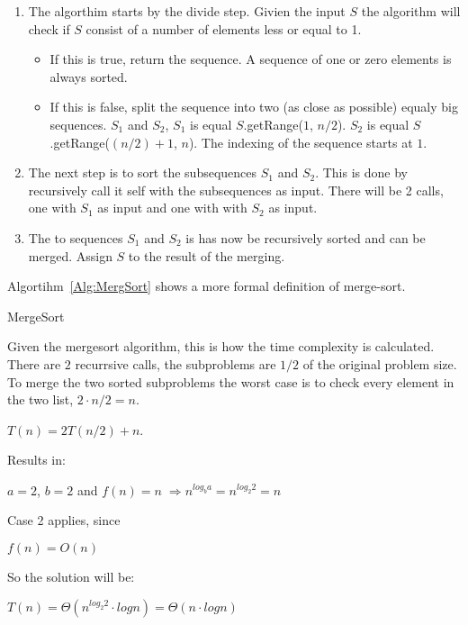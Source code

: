 \begin{enumerate}
\item The algorthim starts by the divide step. Givien the input $S$ the algorithm will check if $S$ consist of a number of elements less or equal to 1.
\begin{itemize}
\item If this is true, return the sequence. A sequence of one or zero elements is always sorted.  
\item If this is false, split the sequence into two (as close as possible) equaly big sequences. $S_1$ and $S_2$, $S_1$ is equal $S$.getRange($1$, $n/2$).
$S_2$ is equal $S$.getRange($(n/2)+1$, $n$). The indexing of the sequence starts at $1$.
\end{itemize}
\item The next step is to sort the subsequences $S_1$ and $S_2$. This is done by recursively call it self with the subsequences as input. There will be 2 calls, one with $S_1$ as input and one with with $S_2$ as input.
\item The to sequences $S_1$ and $S_2$ is has now be recursively sorted and can be merged. Assign $S$ to the result of the merging.
\end{enumerate}
Algortihm~\ref{Alg:MergSort} shows a more formal definition of merge-sort.

\begin{algorithm}
\DontPrintSemicolon
{}
\caption{MergeSort}
\label{Alg:MergSort}
\end{algorithm}

Given the mergesort algorithm, this is how the time complexity is calculated.
There are $2$ recurrsive calls, the subproblems are $1/2$ of the original problem size. To merge the two sorted subproblems the worst case is to check every element in the two list, $2 \cdot n/2 = n$. 
\begin{center}
 $T(n) = 2T(n/2) + n$.
\end{center}
Results in: 
\begin{center}
$a = 2$, $b = 2$ and $f(n) = n \;
\Rightarrow n^{log_b a} = n^{log_2 2} = n$
\end{center}
Case 2 applies, since
\begin{center}
$f(n) = O(n)$
\end{center}
So the solution will be:
\begin{center}
$T(n) = \Theta(n^{log_2 2} \cdot log n) = \Theta(n \cdot log n)$
\end{center}


